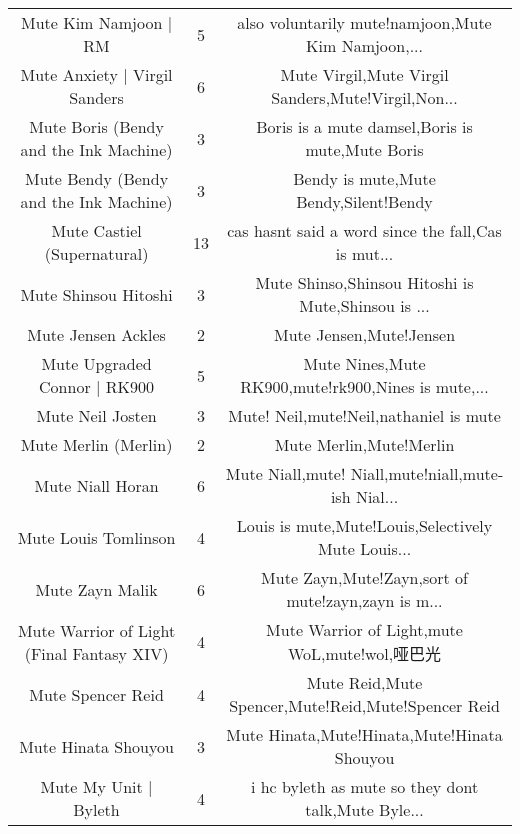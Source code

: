 \begin{table}[h!]
{\begin{tabular}{|c|c|c|}
                             Mute Kim Namjoon | RM &      5 & also voluntarily mute!namjoon,Mute Kim Namjoon,... \\
                     Mute Anxiety | Virgil Sanders &      6 & Mute Virgil,Mute Virgil Sanders,Mute!Virgil,Non... \\
            Mute Boris (Bendy and the Ink Machine) &      3 &    Boris is a mute damsel,Boris is mute,Mute Boris \\
            Mute Bendy (Bendy and the Ink Machine) &      3 &              Bendy is mute,Mute Bendy,Silent!Bendy \\
                       Mute Castiel (Supernatural) &     13 & cas hasnt said a word since the fall,Cas is mut... \\
                              Mute Shinsou Hitoshi &      3 & Mute Shinso,Shinsou Hitoshi is Mute,Shinsou is ... \\
                                Mute Jensen Ackles &      2 &                            Mute Jensen,Mute!Jensen \\
                      Mute Upgraded Connor | RK900 &      5 & Mute Nines,Mute RK900,mute!rk900,Nines is mute,... \\
                                  Mute Neil Josten &      3 &             Mute! Neil,mute!Neil,nathaniel is mute \\
                              Mute Merlin (Merlin) &      2 &                            Mute Merlin,Mute!Merlin \\
                                  Mute Niall Horan &      6 & Mute Niall,mute! Niall,mute!niall,mute-ish Nial... \\
                              Mute Louis Tomlinson &      4 & Louis is mute,Mute!Louis,Selectively Mute Louis... \\
                                   Mute Zayn Malik &      6 & Mute Zayn,Mute!Zayn,sort of mute!zayn,zayn is m... \\
         Mute Warrior of Light (Final Fantasy XIV) &      4 &        Mute Warrior of Light,mute WoL,mute!wol,哑巴光 \\
                                 Mute Spencer Reid &      4 & Mute Reid,Mute Spencer,Mute!Reid,Mute!Spencer Reid \\
                               Mute Hinata Shouyou &      3 &        Mute Hinata,Mute!Hinata,Mute!Hinata Shouyou \\
                             Mute My Unit | Byleth &      4 & i hc byleth as mute so they dont talk,Mute Byle... \\

\end{tabular}}
\end{table}
